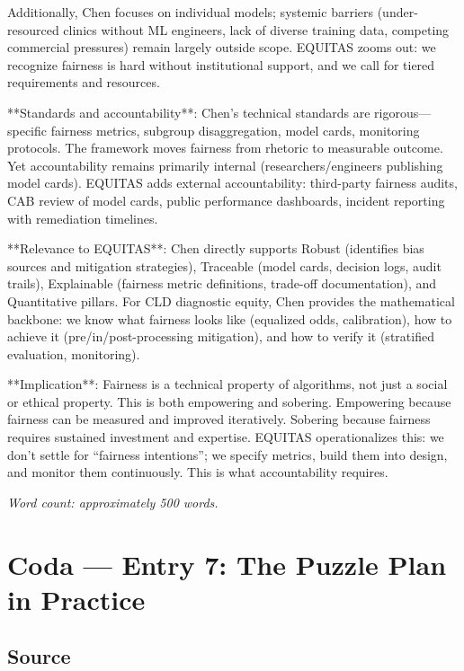 \documentclass[12pt,twoside]{article}
\begin{document}
Additionally, Chen focuses on individual models; systemic barriers (under-resourced clinics without ML engineers, lack of diverse training data, competing commercial pressures) remain largely outside scope. EQUITAS zooms out: we recognize fairness is hard without institutional support, and we call for tiered requirements and resources.

**Standards and accountability**: Chen's technical standards are rigorous---specific fairness metrics, subgroup disaggregation, model cards, monitoring protocols. The framework moves fairness from rhetoric to measurable outcome. Yet accountability remains primarily internal (researchers/engineers publishing model cards). EQUITAS adds external accountability: third-party fairness audits, CAB review of model cards, public performance dashboards, incident reporting with remediation timelines.

**Relevance to EQUITAS**: Chen directly supports Robust (identifies bias sources and mitigation strategies), Traceable (model cards, decision logs, audit trails), Explainable (fairness metric definitions, trade-off documentation), and Quantitative pillars. For CLD diagnostic equity, Chen provides the mathematical backbone: we know what fairness looks like (equalized odds, calibration), how to achieve it (pre/in/post-processing mitigation), and how to verify it (stratified evaluation, monitoring).

**Implication**: Fairness is a technical property of algorithms, not just a social or ethical property. This is both empowering and sobering. Empowering because fairness can be measured and improved iteratively. Sobering because fairness requires sustained investment and expertise. EQUITAS operationalizes this: we don't settle for ``fairness intentions''; we specify metrics, build them into design, and monitor them continuously. This is what accountability requires.

\emph{Word count: approximately 500 words.}

\newpage

\section*{Coda --- Entry 7: The Puzzle Plan in Practice}

\subsection*{Source}
\end{document}

